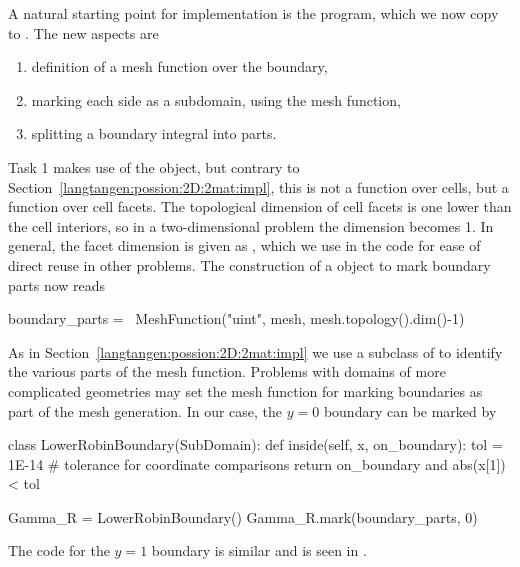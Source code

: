 A natural starting point for implementation is the 
program, which we now copy to .  The new aspects
are
\begin{enumerate}
\item definition of a mesh function over the boundary,
\item marking each side as a subdomain, using the mesh function,
\item splitting a boundary integral into parts.
\end{enumerate}
Task 1 makes use of the  object, but contrary to
Section~\ref{langtangen:possion:2D:2mat:impl}, this is not a function
over cells, but a function over cell facets. The topological dimension of
cell facets is one lower than the cell interiors, so in a two-dimensional
problem the dimension becomes 1. In general, the facet dimension is given
as , which we use in the code for ease of
direct reuse in other problems.  The construction of a 
object to mark boundary parts now reads
\begin{python}
boundary_parts = \
  MeshFunction("uint", mesh, mesh.topology().dim()-1)
\end{python}
As in Section~\ref{langtangen:possion:2D:2mat:impl} we use a
subclass of  to identify the various parts of the mesh
function. Problems with domains of more complicated geometries may set
the mesh function for marking boundaries as part of the mesh generation.
In our case, the $y=0$ boundary can be marked by
\begin{python}
class LowerRobinBoundary(SubDomain):
    def inside(self, x, on_boundary):
        tol = 1E-14   # tolerance for coordinate comparisons
        return on_boundary and abs(x[1]) < tol

Gamma_R = LowerRobinBoundary()
Gamma_R.mark(boundary_parts, 0)
\end{python}
The code for the $y=1$ boundary is similar and is seen in
.

